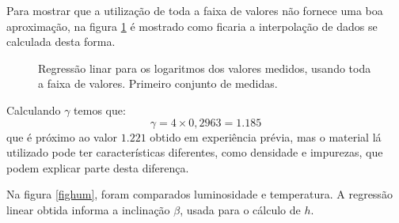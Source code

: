 \documentclass[brazilian,12pt,a4paper,final]{article}
\begin{document}
Para mostrar que a utilização de toda a faixa de valores não fornece uma boa aproximação,
na figura \ref{figfimgr} é mostrado como ficaria a interpolação de dados se calculada desta forma.

\begin{figure}[htbp!]
  \caption{Regressão linar para os logaritmos dos valores medidos, usando toda a faixa de valores. Primeiro conjunto de medidas.}
  \label{figfimgr}
  \centering
\end{figure}

Calculando $\gamma$ temos que:
$$\gamma=4\times 0,2963=1.185$$
que é próximo ao valor $1.221$ obtido em experiência prévia,
mas o material lá utilizado pode ter características diferentes,
como densidade e impurezas, que podem explicar parte desta diferença.


Na figura \ref{fighum}, foram comparados luminosidade e temperatura. A regressão linear obtida informa a inclinação $\beta$, usada para o cálculo de $h$.
\end{document}
